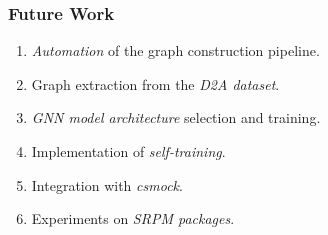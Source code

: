 \documentclass[10pt,xcolor=pdflatex,hyperref={unicode}]{beamer}
\begin{document}
\begin{frame}\frametitle{Future Work}
\doublespacing

    \begin{enumerate}
        \item \emph{Automation} of the graph construction pipeline.
        \item Graph extraction from the \emph{D2A dataset}.
        \item \emph{GNN model architecture} selection and training.
        \item Implementation of \emph{self-training}.
        \item Integration with \emph{csmock}.
        \item Experiments on \emph{SRPM packages}.
    \end{enumerate}

\singlespacing
\end{frame}
\end{document}
